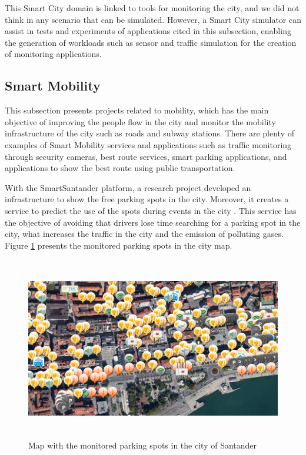 This Smart City domain is linked to tools for monitoring the city, and we did not think in any scenario that can be simulated. However, a Smart City simulator can assist in tests and experiments of applications cited in this subsection, enabling the generation of workloads such as sensor and traffic simulation for the creation of monitoring applications.

\subsection{Smart Mobility}

This subsection presents projects related to mobility, which has the main objective of improving the people flow in the city and monitor the mobility infrastructure of the city such as roads and subway stations. There are plenty of examples of Smart Mobility services and applications such as traffic monitoring through security cameras, best route services, smart parking applications, and applications to show the best route using public transportation.

With the SmartSantander platform, a research project developed an infrastructure to show the free parking spots in the city. Moreover, it creates a service to predict the use of the spots during events in the city \cite{vlahogianni2014exploiting}. This service has the objective of avoiding that drivers lose time searching for a parking spot in the city, what increases the traffic in the city and the emission of polluting gases. Figure \ref{figure:smartsantandermap} presents the monitored parking spots in the city map.

\begin{figure}[!htb]
\centering
\includegraphics[height=8cm]{figuras/smartsantandermap}
\caption{Map with the monitored parking spots in the city of Santander}
\label{figure:smartsantandermap}
\end{figure}

